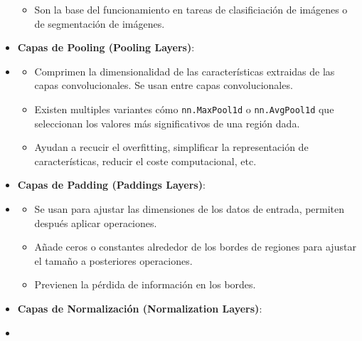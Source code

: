 \begin{itemize}
\begin{itemize}
              \item Son la base del funcionamiento en tareas de clasificiación de imágenes o de segmentación de imágenes.
          \end{itemize}
    \item \textbf{Capas de Pooling (Pooling Layers)}: %
    \item[]
          \begin{itemize}
              \item Comprimen la dimensionalidad de las características extraidas de las capas convolucionales. Se usan entre capas convolucionales.
              \item Existen multiples variantes cómo \texttt{nn.MaxPool1d} o \texttt{nn.AvgPool1d} que seleccionan los valores más significativos de una región dada.
              \item Ayudan a recucir el {overfitting}, simplificar la representación de características, reducir el coste computacional, etc.
          \end{itemize}
    \item \textbf{Capas de Padding (Paddings Layers)}: %
    \item[]
          \begin{itemize}
              \item Se usan para ajustar las dimensiones de los datos de entrada, permiten después aplicar operaciones.
              \item Añade ceros o constantes alrededor de los bordes de regiones para ajustar el tamaño a posteriores operaciones.
              \item Previenen la pérdida de información en los bordes.
          \end{itemize}
    \item \textbf{Capas de Normalización (Normalization Layers)}: %
    \item[]

\end{itemize}
